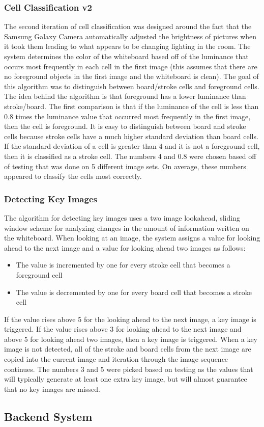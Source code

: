 \documentclass[]{article}
\begin{document}
			\subsubsection{Cell Classification v2}
				The second iteration of cell classification was designed around the fact that the Samsung Galaxy Camera automatically adjusted the brightness of pictures when it took them leading to what appears to be changing lighting in the room. The system determines the color of the whiteboard based off of the luminance that occurs most frequently in each cell in the first image (this assumes that there are no foreground objects in the first image and the whiteboard is clean). The goal of this algorithm was to distinguish between board/stroke cells and foreground cells. The idea behind the algorithm is that foreground has a lower luminance than stroke/board. The first comparison is that if the luminance of the cell is less than 0.8 times the luminance value that occurred most frequently in the first image, then the cell is foreground. It is easy to distinguish between board and stroke cells because stroke cells have a much higher standard deviation than board cells. If the standard deviation of a cell is greater than 4 and it is not a foreground cell, then it is classified as a stroke cell. The numbers 4 and 0.8 were chosen based off of testing that was done on 5 different image sets. On average, these numbers appeared to classify the cells most correctly. 
								
			\subsubsection{Detecting Key Images}
				The algorithm for detecting key images uses a two image lookahead, sliding window scheme for analyzing changes in the amount of information written on the whiteboard. When looking at an image, the system assigns a value for looking ahead to the next image and a value for looking ahead two images as follows:
				\begin{itemize}
					\item The value is incremented by one for every stroke cell that becomes a foreground cell
					\item The value is decremented by one for every board cell that becomes a stroke cell
				\end{itemize}
				If the value rises above 5 for the looking ahead to the next image, a key image is triggered. If the value rises above 3 for looking ahead to the next image and above 5 for looking ahead two images, then a key image is triggered. When a key image is not detected, all of the stroke and board cells from the next image are copied into the current image and iteration through the image sequence continues. The numbers 3 and 5 were picked based on testing as the values that will typically generate at least one extra key image, but will almost guarantee that no key images are missed. 
		
		\subsection{Backend System}

	
	\newpage
	
	
\end{document}
